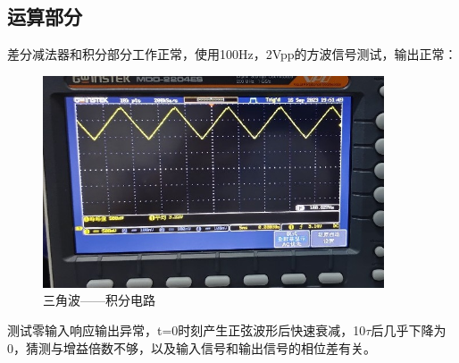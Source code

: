 \documentclass[a4paper]{article}
\theoremstyle{definition}
\theoremstyle{plain}
\theoremstyle{remark}
\begin{document}
\subsection{运算部分}
差分减法器和积分部分工作正常，使用100Hz，2Vpp的方波信号测试，输出正常：
\begin{figure}[H]
	\centering
	\includegraphics[width=0.9\textwidth]{三角波——积分电路}
	\caption{三角波——积分电路}
\end{figure}
测试零输入响应输出异常，t=0时刻产生正弦波形后快速衰减，10$\tau$后几乎下降为0，猜测与增益倍数不够，以及输入信号和输出信号的相位差有关。
\end{document}
